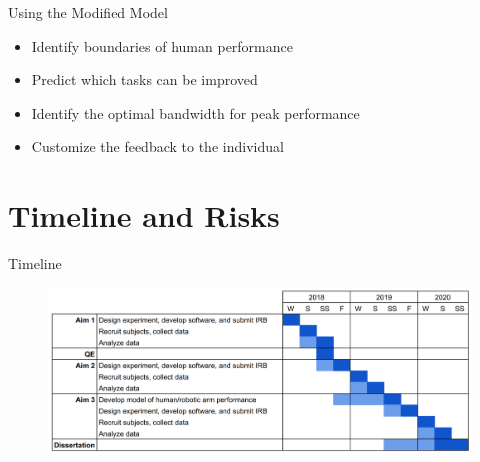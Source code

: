 \documentclass[10pt]{beamer}
\begin{document}
\begin{frame}[fragile]{Using the Modified Model}
  \begin{itemize}
    \setlength\itemsep{1em}
    \item Identify boundaries of human performance
    \item Predict which tasks can be improved
    \item Identify the optimal bandwidth for peak performance
    \item Customize the feedback to the individual
  \end{itemize}
\end{frame}

\section{Timeline and Risks}

\begin{frame}[fragile]{Timeline}
  \begin{figure}[h!]
    \begin{center}
      \includegraphics[width=\linewidth]{../img/image1.png}
    \end{center}
  \end{figure}
\end{frame}
\end{document}
